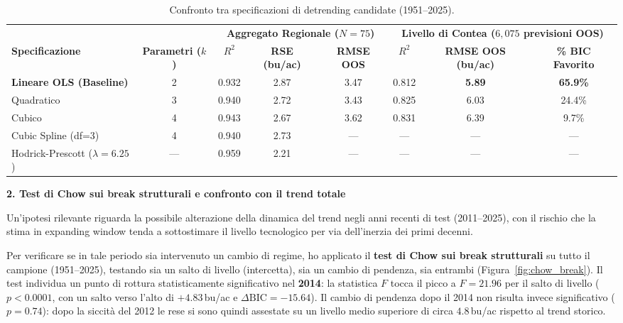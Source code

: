 \documentclass[10pt,a4paper]{article}
\begin{document}
\begin{table}[H]
\centering
\scriptsize
\setlength{\tabcolsep}{3.5pt}
\renewcommand{\arraystretch}{1.06}
\caption{Confronto tra specificazioni di detrending candidate (1951--2025).}
\label{tab:thesis_detrending_comp}
\begin{tabular*}{\textwidth}{@{\extracolsep{\fill}} l c ccc ccc @{}}
\toprule
& & \multicolumn{3}{c}{\textbf{Aggregato Regionale ($N=75$)}} & \multicolumn{3}{c}{\textbf{Livello di Contea ($6{,}075$ previsioni OOS)}} \\
\cmidrule(lr){3-5}\cmidrule(lr){6-8}
\textbf{Specificazione} & \textbf{Parametri ($k$)} & \textbf{$R^2$} & \textbf{RSE (bu/ac)} & \textbf{RMSE OOS} & \textbf{$R^2$} & \textbf{RMSE OOS (bu/ac)} & \textbf{\% BIC Favorito} \\
\midrule
\textbf{Lineare OLS (Baseline)} & 2 & 0.932 & 2.87 & 3.47 & 0.812 & \textbf{5.89} & \textbf{65.9\%} \\
Quadratico & 3 & 0.940 & 2.72 & 3.43 & 0.825 & 6.03 & 24.4\% \\
Cubico & 4 & 0.943 & 2.67 & 3.62 & 0.831 & 6.39 & 9.7\% \\
Cubic Spline (df=3) & 4 & 0.940 & 2.73 & --- & --- & --- & --- \\
Hodrick-Prescott ($\lambda=6.25$) & --- & 0.959 & 2.21 & --- & --- & --- & --- \\
\bottomrule
\end{tabular*}
\end{table}

\vspace{0.2em}
\noindent \textbf{\large 2. Test di Chow sui break strutturali e confronto con il trend totale}
\vspace{0.15em}

\noindent Un'ipotesi rilevante riguarda la possibile alterazione della dinamica del trend negli anni recenti di test (2011--2025), con il rischio che la stima in expanding window tenda a sottostimare il livello tecnologico per via dell'inerzia dei primi decenni.

\noindent Per verificare se in tale periodo sia intervenuto un cambio di regime, ho applicato il \textbf{test di Chow sui break strutturali} su tutto il campione (1951--2025), testando sia un salto di livello (intercetta), sia un cambio di pendenza, sia entrambi (Figura~\ref{fig:chow_break}). Il test individua un punto di rottura statisticamente significativo nel \textbf{2014}: la statistica $F$ tocca il picco a $F = 21.96$ per il salto di livello ($p < 0.0001$, con un salto verso l'alto di $\boldsymbol{+4.83}$\,bu/ac e $\Delta\text{BIC} = -15.64$). Il cambio di pendenza dopo il 2014 non risulta invece significativo ($p = 0.74$): dopo la siccità del 2012 le rese si sono quindi assestate su un livello medio superiore di circa $4.8$\,bu/ac rispetto al trend storico.
\end{document}
